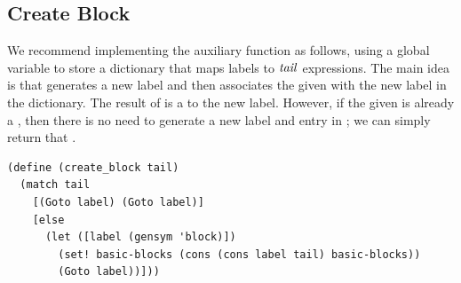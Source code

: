 \documentclass[7x10]{TimesAPriori_MIT}%
\numberwithin{theorem}{chapter}
\numberwithin{definition}{chapter}
\numberwithin{equation}{chapter}
\begin{document}
{\subsection{Create Block}

We recommend implementing the  auxiliary function
as follows, using a global variable  to store a
dictionary that maps labels to $\mathit{tail}$ expressions. The main idea is
that  generates a new label and then associates
the given  with the new label in the 
dictionary. The result of  is a  to the
new label. However, if the given  is already a ,
then there is no need to generate a new label and entry in
; we can simply return that .
%
\begin{lstlisting}
(define (create_block tail)
  (match tail
    [(Goto label) (Goto label)]
    [else
      (let ([label (gensym 'block)])
        (set! basic-blocks (cons (cons label tail) basic-blocks))
        (Goto label))]))
\end{lstlisting}


\fi}
\end{document}
